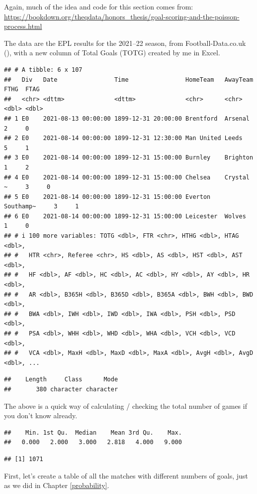 \documentclass[
]{book}
\begin{document}
Again, much of the idea and code for this section comes from: \url{https://bookdown.org/theqdata/honors_thesis/goal-scoring-and-the-poisson-process.html}

The data are the EPL results for the 2021--22 season, from Football-Data.co.uk (), with a new column of Total Goals (TOTG) created by me in Excel.

\begin{verbatim}
## # A tibble: 6 x 107
##   Div   Date                Time                HomeTeam   AwayTeam   FTHG  FTAG
##   <chr> <dttm>              <dttm>              <chr>      <chr>     <dbl> <dbl>
## 1 E0    2021-08-13 00:00:00 1899-12-31 20:00:00 Brentford  Arsenal       2     0
## 2 E0    2021-08-14 00:00:00 1899-12-31 12:30:00 Man United Leeds         5     1
## 3 E0    2021-08-14 00:00:00 1899-12-31 15:00:00 Burnley    Brighton      1     2
## 4 E0    2021-08-14 00:00:00 1899-12-31 15:00:00 Chelsea    Crystal ~     3     0
## 5 E0    2021-08-14 00:00:00 1899-12-31 15:00:00 Everton    Southamp~     3     1
## 6 E0    2021-08-14 00:00:00 1899-12-31 15:00:00 Leicester  Wolves        1     0
## # i 100 more variables: TOTG <dbl>, FTR <chr>, HTHG <dbl>, HTAG <dbl>,
## #   HTR <chr>, Referee <chr>, HS <dbl>, AS <dbl>, HST <dbl>, AST <dbl>,
## #   HF <dbl>, AF <dbl>, HC <dbl>, AC <dbl>, HY <dbl>, AY <dbl>, HR <dbl>,
## #   AR <dbl>, B365H <dbl>, B365D <dbl>, B365A <dbl>, BWH <dbl>, BWD <dbl>,
## #   BWA <dbl>, IWH <dbl>, IWD <dbl>, IWA <dbl>, PSH <dbl>, PSD <dbl>,
## #   PSA <dbl>, WHH <dbl>, WHD <dbl>, WHA <dbl>, VCH <dbl>, VCD <dbl>,
## #   VCA <dbl>, MaxH <dbl>, MaxD <dbl>, MaxA <dbl>, AvgH <dbl>, AvgD <dbl>, ...
\end{verbatim}

\begin{verbatim}
##    Length     Class      Mode 
##       380 character character
\end{verbatim}

The above is a quick way of calculating / checking the total number of games if you don't know already.

\begin{verbatim}
##    Min. 1st Qu.  Median    Mean 3rd Qu.    Max. 
##   0.000   2.000   3.000   2.818   4.000   9.000
\end{verbatim}

\begin{verbatim}
## [1] 1071
\end{verbatim}

First, let's create a table of all the matches with different numbers of goals, just as we did in Chapter \ref{probability}.
\end{document}
